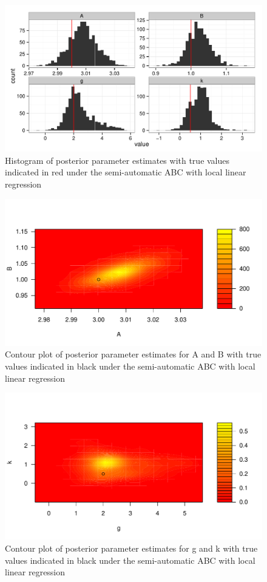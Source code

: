 \documentclass[a4paper,10pt]{article}
\begin{document}
\begin{figure}
\label{fig:HIST_SA}
\includegraphics[width = \linewidth]{GK_REG_M_HIST_SA.pdf}
\caption{Histogram of posterior parameter estimates with true values indicated in red under the semi-automatic ABC with local linear regression}
\end{figure}

\begin{figure}
\label{fig:CONT_AB}
\includegraphics[width = \linewidth]{GK_REG_M_CONT_AB_SA.pdf}
\caption{Contour plot of posterior parameter estimates for A and B with true values indicated in black under the semi-automatic ABC with local linear regression}
\end{figure}

\begin{figure}
\label{fig:CONT_GK}
\includegraphics[width = \linewidth]{GK_REG_M_CONT_GK_SA.pdf}
\caption{Contour plot of posterior parameter estimates for g and k with true values indicated in black under the semi-automatic ABC with local linear regression}
\end{figure}
\end{document}
